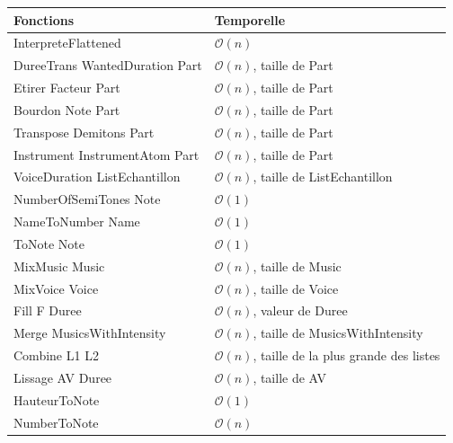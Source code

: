 \documentclass[10pt,a4paper]{article}
\begin{document}
\begin{center}
		\begin{tabular}{|l|l|}
		\hline
		\textbf{Fonctions}																& \textbf{Temporelle}								\\
		\hline
		InterpreteFlattened																& $\mathcal{O}(n)$ 									\\
		\hline
		DureeTrans WantedDuration Part 										& $\mathcal{O}(n)$, taille de Part								\\
		\hline 
		Etirer Facteur Part																& $\mathcal{O}(n)$, taille de Part 						 	\\
		\hline
		Bourdon Note Part																	& $\mathcal{O}(n)$, taille de Part 						 	\\
		\hline
		Transpose Demitons Part														& $\mathcal{O}(n)$, taille de Part 						 	\\
		\hline
		Instrument InstrumentAtom Part										& $\mathcal{O}(n)$, taille de Part								\\
		\hline
		VoiceDuration ListEchantillon											& $\mathcal{O}(n)$, taille de ListEchantillon	 	\\
		\hline
		NumberOfSemiTones Note														& $\mathcal{O}(1)$ 														 	\\
		\hline
		NameToNumber Name																	& $\mathcal{O}(1)$ 														 	\\
		\hline
		ToNote Note																				& $\mathcal{O}(1)$ 															 \\ 
		\hline
		\hline
		MixMusic Music																		& $\mathcal{O}(n)$, taille de Music						 \\
		\hline
		MixVoice Voice																		& $\mathcal{O}(n)$, taille de Voice						 \\
		\hline
		Fill F Duree																			& $\mathcal{O}(n)$, valeur de Duree						 \\
		\hline
		Merge MusicsWithIntensity													& $\mathcal{O}(n)$, taille de MusicsWithIntensity	 \\
		\hline
		Combine L1 L2																			& $\mathcal{O}(n)$, taille de la plus grande des listes	 \\
		\hline
		Lissage AV Duree																	& $\mathcal{O}(n)$, taille de AV								 \\
		\hline
		HauteurToNote																			& $\mathcal{O}(1)$ 														 \\
		\hline
		NumberToNote																			& $\mathcal{O}(n)$ 														 \\
		\hline
		\end{tabular}
\end{center}
\end{document}
